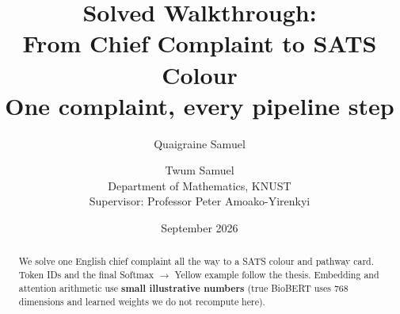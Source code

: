 \documentclass[11pt,a4paper]{article}
\title{Solved Walkthrough:\\From Chief Complaint to SATS Colour\\[0.35em]
\large One complaint, every pipeline step}
\author{Quaigraine Samuel \and Twum Samuel\\
\small Department of Mathematics, KNUST\\
Supervisor: Professor Peter Amoako-Yirenkyi}
\date{September 2026}
\begin{document}
\maketitle

\begin{abstract}
We solve one English chief complaint all the way to a SATS colour and pathway card.
Token IDs and the final Softmax \(\to\) Yellow example follow the thesis.
Embedding and attention arithmetic use \textbf{small illustrative numbers}
(true BioBERT uses 768 dimensions and learned weights we do not recompute here).
\end{abstract}

\tableofcontents
\newpage





\end{document}
